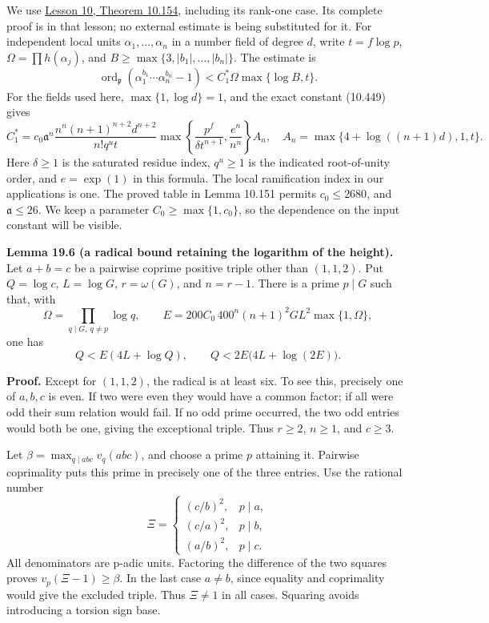 \documentclass[
  11pt,
  a4paper,
]{article}
\begin{document}
We use \href{https://kokunoyumeto.github.io/open-math-courses-public/courses/TR-BAKER/TR-BAKER-10.html}{Lesson 10, Theorem 10.154}, including
its rank-one case. Its complete proof is in that lesson; no external
estimate is being substituted for it. For independent local units
\(\alpha_1,\ldots,\alpha_n\) in a number field of degree \(d\), write
\(t=f\log p\), \(\Omega=\prod h(\alpha_j)\), and
\(B\ge\max\{3,|b_1|,\ldots,|b_n|\}\). The estimate is \[
 \operatorname{ord}_{\mathfrak p}
       (\alpha_1^{b_1}\cdots\alpha_n^{b_n}-1)
 < C_1^*\Omega\max\{\log B,t\}.
 \tag{19.19}
\] For the fields used here, \(\max\{1,\log d\}=1\), and the exact
constant (10.449) gives \[
 C_1^*=
 c_0\mathfrak a^n
 \frac{n^n(n+1)^{n+2}d^{n+2}}{n!q^ut}
 \max\left\{\frac{p^f}{\delta t^{n+1}},
                         \frac{e^n}{n^n}\right\}A_n,
 \quad A_n=\max\{4+\log((n+1)d),1,t\}.
 \tag{19.20}
\] Here \(\delta\ge1\) is the saturated residue index, \(q^u\ge1\) is
the indicated root-of-unity order, and \(e=\exp(1)\) in this formula.
The local ramification index in our applications is one. The proved
table in Lemma 10.151 permits \(c_0\le2680\), and \(\mathfrak a\le26\).
We keep a parameter \(C_0\ge\max\{1,c_0\}\), so the dependence on the
input constant will be visible.

\textbf{Lemma 19.6 (a radical bound retaining the logarithm of the
height).} Let \(a+b=c\) be a pairwise coprime positive triple other than
\((1,1,2)\). Put \(Q=\log c\), \(L=\log G\), \(r=\omega(G)\), and
\(n=r-1\). There is a prime \(p\mid G\) such that, with \[
 \Omega=\prod_{q\mid G,\ q\ne p}\log q,
 \qquad
 E=200C_0\,400^n(n+1)^2GL^2\max\{1,\Omega\},
 \tag{19.21}
\] one has \[
 Q<E(4L+\log Q),\qquad
 Q<2E\bigl(4L+\log(2E)\bigr).
 \tag{19.22}
\]

\textbf{Proof.} Except for \((1,1,2)\), the radical is at least six. To
see this, precisely one of \(a,b,c\) is even. If two were even they
would have a common factor; if all were odd their sum relation would
fail. If no odd prime occurred, the two odd entries would both be one,
giving the exceptional triple. Thus \(r\ge2\), \(n\ge1\), and \(c\ge3\).

Let \(\beta=\max_{q\mid abc}v_q(abc)\), and choose a prime \(p\)
attaining it. Pairwise coprimality puts this prime in precisely one of
the three entries. Use the rational number \[
 \Xi=\begin{cases}
 (c/b)^2,&p\mid a,\\
 (c/a)^2,&p\mid b,\\
 (a/b)^2,&p\mid c.
 \end{cases}
 \tag{19.23}
\] All denominators are p-adic units. Factoring the difference of the
two squares proves \(v_p(\Xi-1)\ge\beta\). In the last case \(a\ne b\),
since equality and coprimality would give the excluded triple. Thus
\(\Xi\ne1\) in all cases. Squaring avoids introducing a torsion sign
base.
\end{document}

